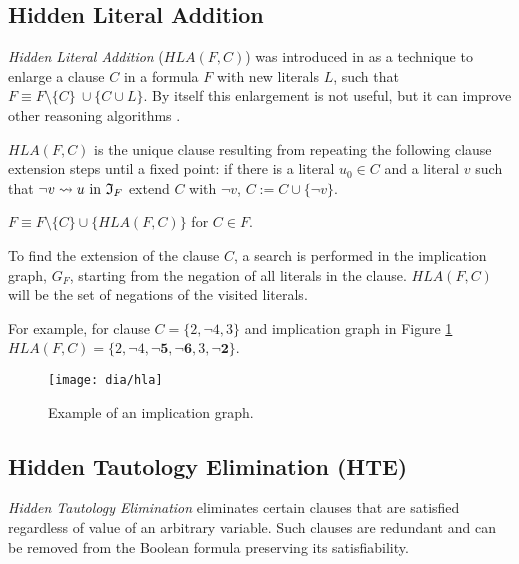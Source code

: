 \subsection{Hidden Literal Addition}
\label{ssec:hla}

\emph{Hidden Literal Addition} ($HLA(F, C)$) was introduced in
\cite{mine:hjb_efficient} as a technique to enlarge a clause $C$
in a formula $F$ with new literals $L$, such that $F \equiv F \setminus \{C\} \
\cup \{ C \cup L \}$. By itself this enlargement is not useful, but it
can improve other reasoning algorithms \cite{Heule:2010:CEP:1928380.1928406, Heule_coveredclause}.

\begin{mydef}
  $HLA(F, C)$ is the unique clause resulting from repeating the following
  clause extension steps until a fixed point: if there is a literal $u_0 \in C$
  and a literal $v$ such that $\neg v \rightsquigarrow u \text{ in } \mathfrak{I}_F$
  extend $C$ with $\neg v$, $C := C \cup \{ \neg v \}$.
\end{mydef}

\begin{myprop}
  $F \equiv F \setminus \{C\} \cup \{HLA(F, C)\}$ for $C \in F$.
\end{myprop}

To find the extension of the clause $C$, a search is performed in
the implication graph, $G_F$, starting from the negation of all
literals in the clause. $HLA(F, C)$ will be the set of negations
of the visited literals.

For example, for clause $C = \{ 2, \neg 4, 3\}$
and implication graph in Figure \ref{fig:hla}
$HLA(F, C) = \{2, \neg 4, \mathbf{\neg 5, \neg 6}, 3, \mathbf{\neg 2} \}$.

\begin{figure}
  \centering
  \texttt{[image: dia/hla]}
  \caption{Example of an implication graph.}
  \label{fig:hla}
\end{figure}


\subsection{Hidden Tautology Elimination (HTE)}
\label{ssec:hte}

\emph{Hidden Tautology Elimination}
\cite{Heule:2010:CEP:1928380.1928406} eliminates certain clauses that
are satisfied regardless of value of an arbitrary variable. Such
clauses are redundant and can be removed from the Boolean formula
preserving its satisfiability.

